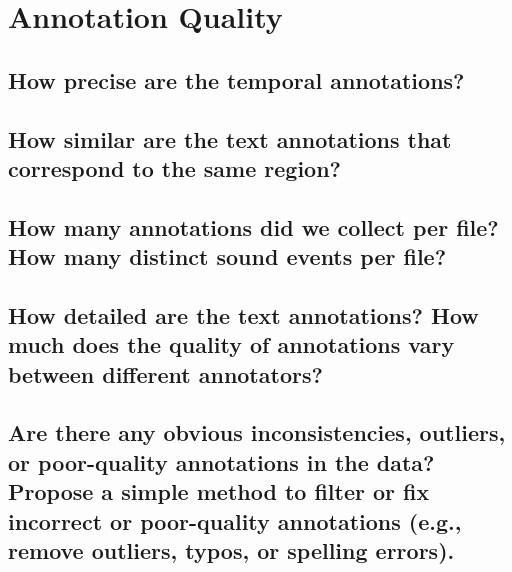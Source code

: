 
\section{Annotation Quality} 
\label{sec:Annotation Quality}


\subsection{How precise are the temporal annotations?}
\label{sec:Annotation Quality:a1}
\lipsum[1-3]


\subsection{How similar are the text annotations that correspond to the same region?}
\label{sec:Annotation Quality:b1}


\subsection{How many annotations did we collect per file? How many distinct sound events per file?}
\label{sec:Annotation Quality:a2}
\lipsum[5]

\subsection{How detailed are the text annotations? How much does the quality of annotations vary between 
different annotators?}
\label{sec:Annotation Quality:b2}


\subsection{Are there any obvious inconsistencies, outliers, or poor-quality annotations in the data? Propose a
simple method to filter or fix incorrect or poor-quality annotations (e.g., remove outliers, typos, or
spelling errors).}
\label{sec:Annotation Quality:c2}



